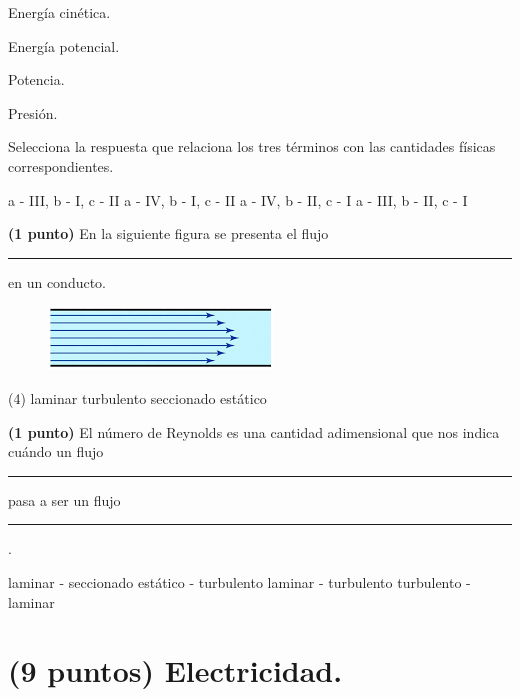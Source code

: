 \documentclass[12pt, letter]{exam}
\begin{document}
\begin{questions}
    \vspace{0.5em}
    \begin{inparaenum}[I)]
            \item Energía cinética. \quad \quad
            \item Energía potencial. \quad \quad
            \item Potencia. \quad \quad
            \item Presión.
    \end{inparaenum}

    Selecciona la respuesta que relaciona los tres términos con las cantidades físicas correspondientes.
    \begin{tasks}
        \task a - III, b - I, c - II
        \task a - IV, b - I, c - II
        \task a - IV, b - II, c - I
        \task a - III, b - II, c - I
    \end{tasks}
    \question \textbf{(1 punto)} En la siguiente figura se presenta el flujo \rule{2cm}{0.1mm} en un conducto.
    \begin{figure}[H]
        \centering
        \includegraphics[scale=0.8]{Flujo_02_Laminar.png}
    \end{figure}
    \begin{tasks}(4)
        \task laminar
        \task turbulento
        \task seccionado
        \task estático
    \end{tasks}
    \question \textbf{(1 punto)} El número de Reynolds es una cantidad adimensional que nos indica cuándo un flujo \rule{2cm}{0.1mm} pasa a ser un flujo \rule{2cm}{0.1mm}.
    \begin{tasks}
        \task laminar - seccionado
        \task estático - turbulento
        \task laminar  - turbulento
        \task turbulento - laminar
    \end{tasks}
    
    \section{(9 puntos) Electricidad.}


\end{questions}
\end{document}
